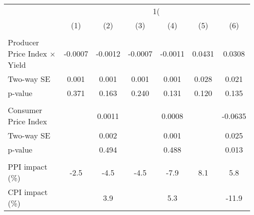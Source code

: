 {
\def\sym#1{\ifmmode^{#1}\else\(^{#1}\)\fi}
\begin{tabular}{l*{6}{c}}
\hline\hline
                    &&&\\\cmidrule(lr){2-3}\cmidrule(lr){4-5}\cmidrule(lr){6-7}
                    &         &         &         &         &         &         \\
\hline
\hline
\\ Producer Price Index $\times$ Yield&     -0.0007         &     -0.0012         &     -0.0007         &     -0.0011         &      0.0431         &      0.0308         \\
\hspace{15pt} Two-way SE&       0.001         &       0.001         &       0.001         &       0.001         &       0.028         &       0.021         \\
\hspace{25pt} p-value&       0.371         &       0.163         &       0.240         &       0.131         &       0.120         &       0.135         \\
\\ Consumer Price Index&                     &      0.0011         &                     &      0.0008         &                     &     -0.0635         \\
\hspace{15pt} Two-way SE&                     &       0.002         &                     &       0.001         &                     &       0.025         \\
\hspace{25pt} p-value&                     &       0.494         &                     &       0.488         &                     &       0.013         \\
\hline \\ PPI impact (\%)&        -2.5         &        -4.5         &        -4.5         &        -7.9         &         8.1         &         5.8         \\
CPI impact (\%)     &                     &         3.9         &                     &         5.3         &                     &       -11.9         \\

\end{tabular}}
